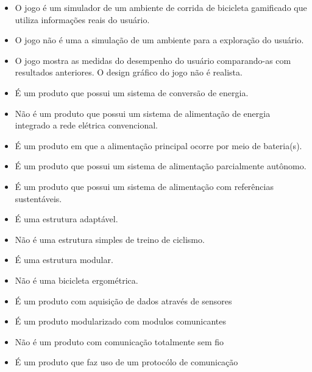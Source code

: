 \begin{itemize}
\item O jogo é um simulador de um ambiente de corrida de bicicleta gamificado que utiliza informações reais do usuário.
\item O jogo não é uma a simulação de um ambiente para a exploração do usuário.
\item O jogo mostra as medidas do desempenho do usuário comparando-as com resultados anteriores. O design gráfico do jogo não é realista.            

\item É um produto que possui um sistema de conversão de energia.
\item Não é um produto que possui um sistema de alimentação de energia integrado a rede elétrica convencional.
\item É um produto em que a alimentação principal ocorre por meio de bateria(s).
\item É um produto que possui um sistema de alimentação parcialmente autônomo.
\item É um produto que possui um sistema de alimentação com referências sustentáveis.

\item É uma estrutura adaptável.
\item Não é uma estrutura simples de treino de ciclismo.
\item É uma estrutura modular.
\item Não é uma bicicleta ergométrica.

\item É um produto com aquisição de dados através de sensores
\item É um produto modularizado com modulos comunicantes
\item Não é um produto com comunicação totalmente sem fio
\item É um produto que faz uso de um protocólo de comunicação


\end{itemize}


